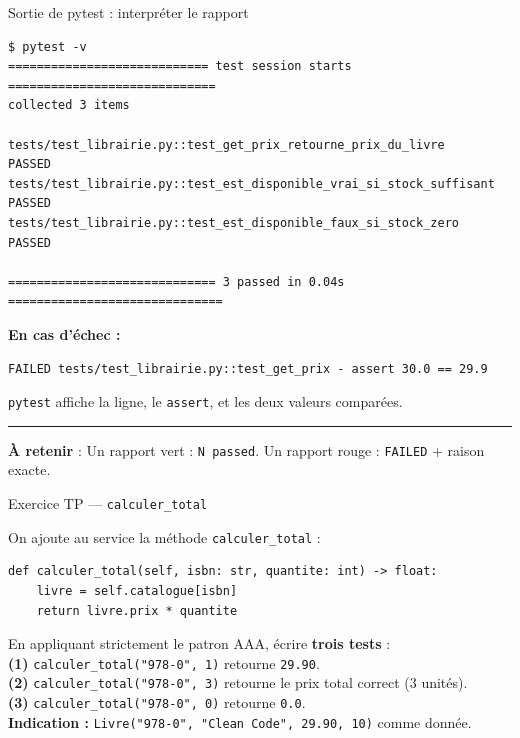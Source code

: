 \documentclass[aspectratio=169,11pt]{beamer}
\newcommand{\takeaway}[1]{%
\vfill\begin{beamercolorbox}[wd=\linewidth,sep=0.4em]{}
\color{accent2}\rule[0.6ex]{1.2em}{1.2pt}\hspace{0.4em}%
\textbf{\color{accent2}\small À retenir} \textcolor{textsoft}{:} %
{\small\color{textmain}#1}
\end{beamercolorbox}}
\begin{document}
\begin{frame}[fragile,t,shrink=15]{Sortie de pytest : interpréter le rapport}
\begin{lstlisting}[style=bashdark]
$ pytest -v
============================ test session starts =============================
collected 3 items

tests/test_librairie.py::test_get_prix_retourne_prix_du_livre        PASSED
tests/test_librairie.py::test_est_disponible_vrai_si_stock_suffisant PASSED
tests/test_librairie.py::test_est_disponible_faux_si_stock_zero      PASSED

============================= 3 passed in 0.04s ==============================
\end{lstlisting}
\vspace{0.3cm}
\footnotesize
\textbf{En cas d'échec :}
\begin{lstlisting}[style=bashdark]
FAILED tests/test_librairie.py::test_get_prix - assert 30.0 == 29.9
\end{lstlisting}
\textcolor{textsoft}{\texttt{pytest} affiche la ligne, le \texttt{assert}, et les deux valeurs comparées.}
\takeaway{Un rapport vert : \texttt{N passed}. Un rapport rouge : \texttt{FAILED} + raison exacte.}
\end{frame}

\begin{frame}[fragile,t]{Exercice TP --- \texttt{calculer\_total}}
\begin{exercice}
On ajoute au service la méthode \texttt{calculer\_total} :
\begin{lstlisting}[style=pythondark]
def calculer_total(self, isbn: str, quantite: int) -> float:
    livre = self.catalogue[isbn]
    return livre.prix * quantite
\end{lstlisting}
\vspace{0.3em}
En appliquant strictement le patron AAA, écrire \textbf{trois tests} :\\[0.2em]
\textbf{(1)} \texttt{calculer\_total("978-0", 1)} retourne \texttt{29.90}.\\
\textbf{(2)} \texttt{calculer\_total("978-0", 3)} retourne le prix total correct (3 unités).\\
\textbf{(3)} \texttt{calculer\_total("978-0", 0)} retourne \texttt{0.0}.\\[0.2em]
\textbf{Indication :} \texttt{Livre("978-0", "Clean Code", 29.90, 10)} comme donnée.
\end{exercice}
\end{frame}
\end{document}
